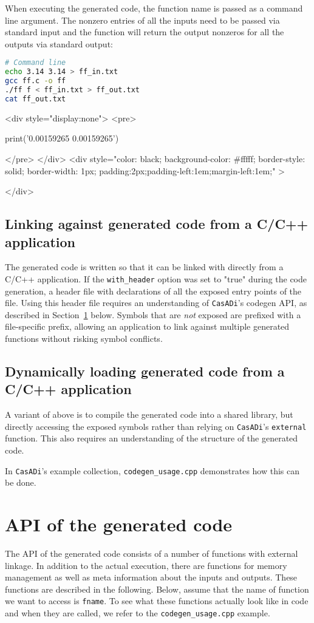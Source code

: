 \documentclass[a4paper,12pt]{book}
\newcommand{\CasADi}{\texttt{CasADi}\xspace}
\newcounter{pytexcount}
\newcounter{pytexsubcount}
\renewenvironment{pytexoutput}
{\addtocounter{pytexsubcount}{1}%
\begin{rawhtml}
<div style="display:none">
<pre>
\end{rawhtml}
}%
{\begin{rawhtml}
</pre>
</div>
<div style="color: black; background-color: \#fffff;  border-style: solid; border-width: 1px; padding:2px;padding-left:1em;margin-left:1em;" >\end{rawhtml}%
\verbatiminputeval{pytex_\alph{pytexcount}_\arabic{pytexsubcount}.log}%
\begin{rawhtml}
</div>
\end{rawhtml}
}
\begin{document}
When executing the generated code, the function name is passed
as a command line argument. The nonzero entries of all the inputs
need to be passed via standard input and the function will return the output
nonzeros for all the outputs via standard output:

\begin{lstlisting}[language=sh]
# Command line
echo 3.14 3.14 > ff_in.txt
gcc ff.c -o ff
./ff f < ff_in.txt > ff_out.txt
cat ff_out.txt
\end{lstlisting}
\begin{pytexoutput}
print('0.00159265 0.00159265')
\end{pytexoutput}

\subsection*{Linking against generated code from a C/C++ application}
The generated code is written so that it can be linked with directly from a C/C++
application. If the \verb|with_header| option was set to "true" during the
code generation, a header file with declarations of all the exposed entry points
of the file. Using this header file requires an understanding of \CasADi's
codegen API, as described in Section~\ref{sec:c_api} below. Symbols that are
\emph{not} exposed are prefixed with a file-specific prefix, allowing an
application to link against multiple generated functions without risking
symbol conflicts.

\subsection*{Dynamically loading generated code from a C/C++ application}
A variant of above is to compile the generated code into a shared library,
but directly accessing the exposed symbols rather than relying on \CasADi's
\texttt{external} function. This also requires an understanding of the structure
of the generated code.

In \CasADi's example collection, \verb|codegen_usage.cpp| demonstrates how this
can be done.

\section{API of the generated code} \label{sec:c_api}
The API of the generated code consists of a number of functions with external
linkage. In addition to the actual execution, there are functions for memory
management as well as meta information about the inputs and outputs.
These functions are described in the following. Below, assume that the name of
function we want to access is \texttt{fname}. To see what these functions actually
look like in code and when they are called, we refer to the
\verb|codegen_usage.cpp| example.
\end{document}
